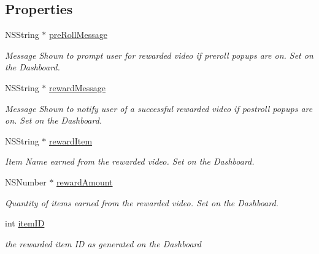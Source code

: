 \subsection*{Properties}
\begin{DoxyCompactItemize}
\item 
\hypertarget{interface_fuse_rewarded_object_ae1d1c7f4c017e468a6b3c1de53e5baf7}{}N\+S\+String $\ast$ \hyperlink{interface_fuse_rewarded_object_ae1d1c7f4c017e468a6b3c1de53e5baf7}{pre\+Roll\+Message}\label{interface_fuse_rewarded_object_ae1d1c7f4c017e468a6b3c1de53e5baf7}

\begin{DoxyCompactList}\small\item\em Message Shown to prompt user for rewarded video if preroll popups are on. Set on the Dashboard. \end{DoxyCompactList}\item 
\hypertarget{interface_fuse_rewarded_object_acd69c101bf237f44d69b5cc310616767}{}N\+S\+String $\ast$ \hyperlink{interface_fuse_rewarded_object_acd69c101bf237f44d69b5cc310616767}{reward\+Message}\label{interface_fuse_rewarded_object_acd69c101bf237f44d69b5cc310616767}

\begin{DoxyCompactList}\small\item\em Message Shown to notify user of a successful rewarded video if postroll popups are on. Set on the Dashboard. \end{DoxyCompactList}\item 
\hypertarget{interface_fuse_rewarded_object_ac61bc6108654e4d118a6f97b79221111}{}N\+S\+String $\ast$ \hyperlink{interface_fuse_rewarded_object_ac61bc6108654e4d118a6f97b79221111}{reward\+Item}\label{interface_fuse_rewarded_object_ac61bc6108654e4d118a6f97b79221111}

\begin{DoxyCompactList}\small\item\em Item Name earned from the rewarded video. Set on the Dashboard. \end{DoxyCompactList}\item 
\hypertarget{interface_fuse_rewarded_object_a2db1b3a56b00af0fc99861443d591913}{}N\+S\+Number $\ast$ \hyperlink{interface_fuse_rewarded_object_a2db1b3a56b00af0fc99861443d591913}{reward\+Amount}\label{interface_fuse_rewarded_object_a2db1b3a56b00af0fc99861443d591913}

\begin{DoxyCompactList}\small\item\em Quantity of items earned from the rewarded video. Set on the Dashboard. \end{DoxyCompactList}\item 
\hypertarget{interface_fuse_rewarded_object_a07f5ea9173ecc7bdcef8797e803133d7}{}int \hyperlink{interface_fuse_rewarded_object_a07f5ea9173ecc7bdcef8797e803133d7}{item\+I\+D}\label{interface_fuse_rewarded_object_a07f5ea9173ecc7bdcef8797e803133d7}

\begin{DoxyCompactList}\small\item\em the rewarded item I\+D as generated on the Dashboard \end{DoxyCompactList}\end{DoxyCompactItemize}



